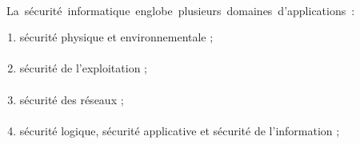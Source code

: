 \paragraph{ }
\hbox{ La sécurité informatique englobe plusieurs domaines d'applications :}
\vspace{5mm}
\begin{enumerate}
 

 \item \space   sécurité physique et environnementale ;
\paragraph{ }
 \item  \space   sécurité de l’exploitation ;
\paragraph{ }
\item   \space  sécurité des réseaux ;
\paragraph{ }
\item   \space  sécurité logique, sécurité applicative et sécurité de l’information ;
\end{enumerate}




